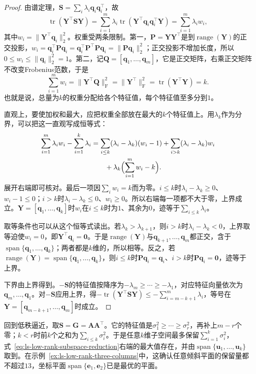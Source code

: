 \begin{proof}
由谱定理，$\bm S=\sum_i\lambda_i\bm q_i\bm q_i^\top$，故
\[
 \operatorname{tr}(\bm Y^\top\bm S\bm Y)
 =\sum_{i=1}^m\lambda_i\operatorname{tr}(\bm Y^\top\bm q_i\bm q_i^\top\bm Y)
 =\sum_{i=1}^m\lambda_iw_i,
\]
其中$w_i=\lVert\bm Y^\top\bm q_i\rVert_2^2$。权重受两条限制。第一，$\bm P=\bm Y\bm Y^\top$是到$\operatorname{range}(\bm Y)$的正交投影，$w_i=\bm q_i^\top\bm P\bm q_i=\bm q_i^\top\bm P^\top\bm P\bm q_i=\lVert\bm P\bm q_i\rVert_2^2$；正交投影不增加长度，所以$0\leq w_i\leq\lVert\bm q_i\rVert_2^2=1$。第二，记$\bm Q=[\bm q_1,\ldots,\bm q_m]$，它是正交矩阵，右乘正交矩阵不改变Frobenius范数，于是
\[
 \sum_{i=1}^mw_i=\lVert\bm Y^\top\bm Q\rVert_{\mathrm F}^2=\lVert\bm Y^\top\rVert_{\mathrm F}^2=\operatorname{tr}(\bm Y^\top\bm Y)=k .
\]
也就是说，总量为$k$的权重分配给各个特征值，每个特征值至多分到$1$。

直观上，要使加权和最大，应把权重全部放在最大的$k$个特征值上。用$\lambda_k$作为分界，可以把这一直观写成恒等式：
\[
 \begin{aligned}
 \sum_{i=1}^m\lambda_iw_i-\sum_{i=1}^k\lambda_i
 &=\sum_{i\leq k}(\lambda_i-\lambda_k)(w_i-1)+\sum_{i>k}(\lambda_i-\lambda_k)w_i\\
 &\qquad+\lambda_k\Bigl(\sum_{i=1}^mw_i-k\Bigr).
 \end{aligned}
\]
展开右端即可核对。最后一项因$\sum_iw_i=k$而为零。$i\leq k$时$\lambda_i-\lambda_k\geq0$、$w_i-1\leq0$；$i>k$时$\lambda_i-\lambda_k\leq0$、$w_i\geq0$。所以右端每一项都不大于零，上界成立。$\bm Y=[\bm q_1,\ldots,\bm q_k]$时$w_i$在$i\leq k$时为$1$、其余为$0$，迹等于$\sum_{i\leq k}\lambda_i$。

取等条件也可以从这个恒等式读出。若$\lambda_k>\lambda_{k+1}$，则$i>k$时$\lambda_i-\lambda_k<0$，上界取等迫使$w_i=0$，即$\bm Y^\top\bm q_i=\bm0$。于是$\operatorname{range}(\bm Y)$与$\bm q_{k+1},\ldots,\bm q_m$都正交，含于$\operatorname{span}\{\bm q_1,\ldots,\bm q_k\}$；两者都是$k$维的，所以相等。反之，若$\operatorname{range}(\bm Y)=\operatorname{span}\{\bm q_1,\ldots,\bm q_k\}$，则$i\leq k$时$\bm P\bm q_i=\bm q_i$、$i>k$时$\bm P\bm q_i=\bm0$，迹等于上界。

下界由上界得到。$-\bm S$的特征值按降序为$-\lambda_m\geq\cdots\geq-\lambda_1$，对应特征向量依次为$\bm q_m,\ldots,\bm q_1$。对$-\bm S$应用上界，得$-\operatorname{tr}(\bm Y^\top\bm S\bm Y)\leq-\sum_{i=m-k+1}^m\lambda_i$，等号在$\bm Y=[\bm q_{m-k+1},\ldots,\bm q_m]$时成立。
\end{proof}

回到低秩逼近，取$\bm S=\bm G=\bm A\bm A^\top$。它的特征值是$\sigma_1^2\geq\cdots\geq\sigma_r^2$，再补上$m-r$个零；$k<r$时前$k$个之和为$\sum_{i\leq k}\sigma_i^2$。于是任意$k$维子空间最多保留$\sum_{i=1}^k\sigma_i^2$，式~\eqref{eq:ls-low-rank-subspace-reduction}右端的最大值存在，并由$\operatorname{span}\{\bm u_1,\ldots,\bm u_k\}$取到。在示例~\ref{ex:ls-low-rank-three-columns}中，这确认任意倾斜平面的保留量都不超过$13$，坐标平面$\operatorname{span}\{\bm e_1,\bm e_2\}$已是最优的平面。

